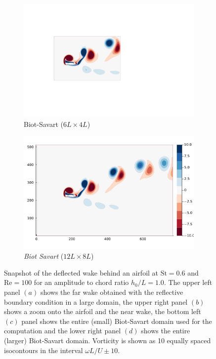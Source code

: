 \documentclass[final,1p,times]{elsarticle}
\begin{document}
\begin{figure}
\begin{subfigure}{.48\textwidth}
        \includegraphics[trim={2.8cm 2cm 4cm 2cm},clip,width=\textwidth]{tex/fig/Deflected_wake_snap_BS.png}
        \caption{Biot-Savart ($6L\times4L$)}
    \end{subfigure}%
    \hspace{0.1cm}
    \begin{subfigure}{.48\textwidth}
        \centering
        \includegraphics[trim={2.8cm 2cm 4cm 2cm},clip,width=\textwidth]{tex//fig/Deflected_wake_snap_BS_2x.png}
        \caption{\emph{Biot Savart} ($12L\times8L$)}
    \end{subfigure}
    \caption{Snapshot of the deflected wake behind an airfoil at $\text{St}=0.6$ and $\text{Re}=100$ for an amplitude to chord ratio $h_0/L=1.0$. The upper left panel $(a)$ shows the far wake obtained with the reflective boundary condition in a large domain, the upper right panel $(b)$ shows a zoom onto the airfoil and the near wake, the bottom left $(c)$ panel shows the entire (small) Biot-Savart domain used for the computation and the lower right panel $(d)$ shows the entire (larger) Biot-Savart domain. Vorticity is shown as 10 equally spaced isocontours in the interval $\omega L/U \pm 10$.}
    \label{fig:deflected_wake}
\end{figure}
\end{document}
